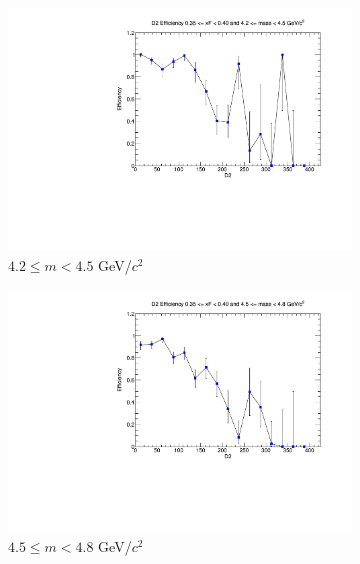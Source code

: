 \documentclass[11pt]{article}
\begin{document}
\begin{figure}[p]
    \centering
    \begin{subfigure}[b]{0.32\textwidth}
        \centering
        \includegraphics[width=\textwidth]{./kTrackerEfficiencyPlots/D2_Efficiency_xF7_mass0.pdf}
        \caption{$4.2 \leq m < 4.5$ GeV/$c^2$}
    \end{subfigure}\hfill
    \begin{subfigure}[b]{0.32\textwidth}
        \centering
        \includegraphics[width=\textwidth]{./kTrackerEfficiencyPlots/D2_Efficiency_xF7_mass1.pdf}
        \caption{$4.5 \leq m < 4.8$ GeV/$c^2$}
    \end{subfigure}\hfill
    \begin{subfigure}[b]{0.32\textwidth}
        \centering

\end{subfigure}
\end{figure}
\end{document}
